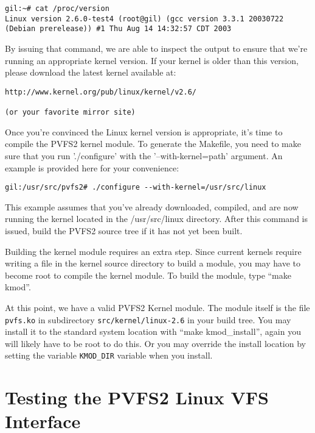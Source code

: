 \documentclass[11pt, letterpaper]{article}
\begin{document}
\begin{verbatim}
gil:~# cat /proc/version 
Linux version 2.6.0-test4 (root@gil) (gcc version 3.3.1 20030722
(Debian prerelease)) #1 Thu Aug 14 14:32:57 CDT 2003
\end{verbatim}

By issuing that command, we are able to inspect the output to ensure
that we're running an appropriate kernel version.  If your kernel is
older than this version, please download the latest kernel available
at:

\begin{verbatim}
http://www.kernel.org/pub/linux/kernel/v2.6/

(or your favorite mirror site)
\end{verbatim}

Once you're convinced the Linux kernel version is appropriate, it's
time to compile the PVFS2 kernel module.  To generate the Makefile,
you need to make sure that you run './configure' with the
'--with-kernel=path' argument.  An example is provided here for your
convenience:

\begin{verbatim}
gil:/usr/src/pvfs2# ./configure --with-kernel=/usr/src/linux
\end{verbatim}

This example assumes that you've already downloaded, compiled, and are
now running the kernel located in the /usr/src/linux directory.  After
this command is issued, build the PVFS2 source tree if it has not yet
been built.

Building the kernel module requires an extra step.  Since current kernels
require writing a file in the kernel source directory to build a module, you
may have to become root to compile the kernel module.  To build the module,
type ``make kmod''.

At this point, we have a valid PVFS2 Kernel module.  The module itself
is the file {\tt pvfs.ko} in subdirectory {\tt src/kernel/linux-2.6} in
your build tree.  You may install it
to the standard system location with ``make kmod\_install'', again you will
likely have to be root to do this.  Or you may override the install location
by setting the variable {\tt KMOD\_DIR} variable when you install.

\section{Testing the PVFS2 Linux VFS Interface}
\label{sec:vfs-test}
\end{document}

